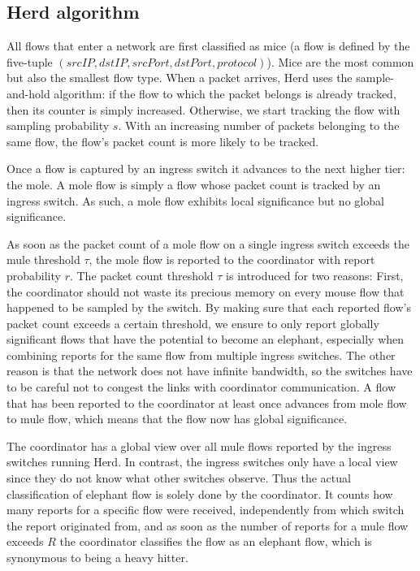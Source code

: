 \documentclass[11pt,oneside,a4paper]{article}
\begin{document}
\subsection{Herd algorithm} \label{animals}

All flows that enter a network are first classified as mice (a flow is defined by the five-tuple $(srcIP, dstIP, srcPort, dstPort, protocol)$). Mice are the most common but also the smallest flow type. When a packet arrives, Herd uses the sample-and-hold algorithm: if the flow to which the packet belongs is already tracked, then its counter is simply increased. Otherwise, we start tracking the flow with sampling probability $s$. With an increasing number of packets belonging to the same flow, the flow's packet count is more likely to be tracked.

\noindent Once a flow is captured by an ingress switch it advances to the next higher tier: the mole. A mole flow is simply a flow whose packet count is tracked by an ingress switch. As such, a mole flow exhibits local significance but no global significance.

As soon as the packet count of a mole flow on a single ingress switch exceeds the mule threshold $\tau$, the mole flow is reported to the coordinator with report probability $r$. The packet count threshold $\tau$ is introduced for two reasons: First, the coordinator should not waste its precious memory on every mouse flow that happened to be sampled by the switch. By making sure that each reported flow's packet count exceeds a certain threshold, we ensure to only report globally significant flows that have the potential to  become an elephant, especially when combining reports for the same flow from multiple ingress switches. The other reason is that the network does not have infinite bandwidth, so the switches have to be careful not to congest the links with coordinator communication. A flow that has been reported to the coordinator at least once advances from mole flow to mule flow, which means that the flow now has global significance.

\newpage

The coordinator has a global view over all mule flows reported by the ingress switches running Herd. In contrast, the ingress switches only have a local view since they do not know what other switches observe. Thus the actual classification of elephant flow is solely done by the coordinator. It counts how many reports for a specific flow were received, independently from which switch the report originated from, and as soon as the number of reports for a mule flow exceeds $R$ the coordinator classifies the flow as an elephant flow, which is synonymous to being a heavy hitter.
\end{document}
